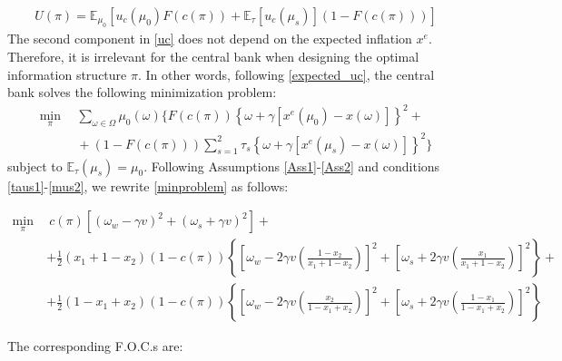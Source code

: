\documentclass[12pt,a4paper]{article}
\begin{document}
\begin{align}
    \label{expected_uc}
    U(\pi)=\mathbb{E}_{\mu_0}\left[u_c(\mu_0)F(c(\pi)) + \mathbb{E}_\tau[u_c(\mu_s)](1-F(c(\pi)))\right]
\end{align}
The second component in \eqref{uc} does not depend on the expected inflation $x^e$. Therefore, it is irrelevant for the central bank when designing the optimal information structure $\pi$. In other words, following \eqref{expected_uc}, the central bank solves the following minimization problem:
\begin{equation}
\label{minproblem}
    \begin{split}
    \min_{\pi} \ & \ \sum_{\omega\in\Omega}\mu_0(\omega)\Big\{F(c(\pi))\left\{\omega+\gamma\left[x^e(\mu_0)-x(\omega)\right]\right\}^2+\\
    \ & \ +(1-F(c(\pi)))\sum_{s=1}^{2}\tau_s\left\{\omega+\gamma\left[x^e(\mu_s)-x(\omega)\right]\right\}^2\Big\}
    \end{split}
\end{equation}
subject to $\mathbb{E}_{\tau}(\mu_s)=\mu_0$. Following Assumptions \ref{Ass1}-\ref{Ass2} and conditions \eqref{taus1}-\eqref{mus2}, we rewrite \eqref{minproblem} as follows:
\begin{small}
    \begin{equation}
    \begin{split}
    \min_{\pi} \ & \ c(\pi)\left[(\omega_w-\gamma v)^2+(\omega_s+\gamma v)^2\right]+\\
     &  +\frac{1}{2}(x_1 + 1-x_2)(1-c(\pi))\left\{\left[\omega_w-2\gamma v\left(\frac{1-x_2}{x_1+1-x_2}\right)\right]^2+\left[\omega_s+2\gamma v\left(\frac{x_1}{x_1+1-x_2}\right)\right]^2\right\}+ \\
     & +\frac{1}{2}(1-x_1 + x_2)(1-c(\pi))\left\{\left[\omega_w-2\gamma v\left(\frac{x_2}{1-x_1+x_2}\right)\right]^2+\left[\omega_s+2\gamma v\left(\frac{1-x_1}{1-x_1+x_2}\right)\right]^2\right\}
    \end{split}
    \end{equation}
\end{small}
The corresponding F.O.C.s are:
\end{document}

